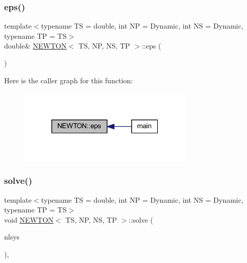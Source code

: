 \subsubsection{\texorpdfstring{eps()}{eps()}}
{\footnotesize\ttfamily template$<$typename TS = double, int NP = Dynamic, int NS = Dynamic, typename TP = TS$>$ \\
double\& \mbox{\hyperlink{class_n_e_w_t_o_n}{N\+E\+W\+T\+ON}}$<$ TS, NP, NS, TP $>$\+::eps (\begin{DoxyParamCaption}{ }\end{DoxyParamCaption})\hspace{0.3cm}{\ttfamily [inline]}}

Here is the caller graph for this function\+:\nopagebreak
\begin{figure}[H]
\begin{center}
\leavevmode
\includegraphics[width=235pt]{class_n_e_w_t_o_n_a222247d7695d9cce96f424a49d5ad2f6_icgraph}
\end{center}
\end{figure}
\mbox{\label{class_n_e_w_t_o_n_a1dd31b882567d3e0427eb53ce169f0ce}} 
\subsubsection{\texorpdfstring{solve()}{solve()}}
{\footnotesize\ttfamily template$<$typename TS = double, int NP = Dynamic, int NS = Dynamic, typename TP = TS$>$ \\
void \mbox{\hyperlink{class_n_e_w_t_o_n}{N\+E\+W\+T\+ON}}$<$ TS, NP, NS, TP $>$\+::solve (\begin{DoxyParamCaption}\item[{\mbox{\hyperlink{class_n_o_n_l_i_n_e_a_r___s_y_s_t_e_m}{N\+O\+N\+L\+I\+N\+E\+A\+R\+\_\+\+S\+Y\+S\+T\+EM}}$<$ TS, NP, NS, TP $>$ \&}]{nlsys }\end{DoxyParamCaption})\hspace{0.3cm}{\ttfamily [inline]}, {\ttfamily [virtual]}}



